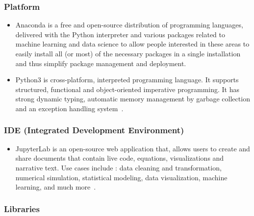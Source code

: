 \subsubsection{Platform}

\begin{itemize}
	
	\item Anaconda is a free and open-source distribution of programming languages, delivered with the Python interpreter and various packages related to machine learning and data science to allow people interested in these areas to easily install all (or most) of the necessary packages in a single installation and thus simplify package management and deployment.
	
	\item Python3 is cross-platform, interpreted programming language. It supports structured, functional and object-oriented imperative programming. It has strong dynamic typing, automatic memory management by garbage collection and an exception handling system~\cite{Python3}.
	
\end{itemize}

\subsubsection{IDE (Integrated Development Environment)}


\begin{itemize}
	
	\item JupyterLab is an open-source web application that, allows users to create and share documents that contain live code, equations, visualizations and narrative text. Use cases include : data cleaning and transformation, numerical simulation, statistical modeling, data visualization, machine learning, and much more~\cite{Jupyter_site}.
	
\end{itemize}

\subsubsection{Libraries}

